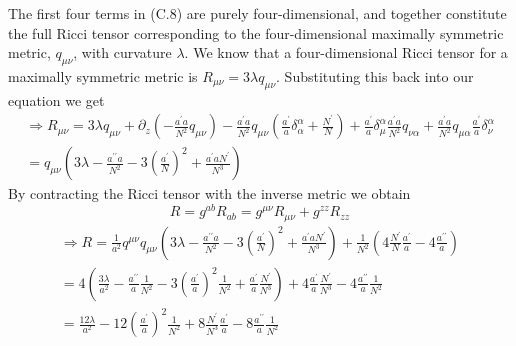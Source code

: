 \documentclass[11pt]{report}
\numberwithin{equation}{chapter}
\begin{document}
The first four terms in (C.8) are purely four-dimensional, and together constitute the full Ricci tensor corresponding to the four-dimensional maximally symmetric metric, $q_{\mu\nu}$, with curvature $\lambda$. We know that a four-dimensional Ricci tensor for a maximally symmetric metric is $R_{\mu\nu} = 3\lambda q_{\mu\nu}$. Substituting this back into our equation we get
\begin{equation}
    \begin{aligned}
        \Rightarrow R_{\mu\nu} = 3\lambda q_{\mu\nu} + \partial_{z}(-\frac{a^\prime a}{N^2}q_{\mu\nu}) - \frac{a^\prime a}{N^2}q_{\mu\nu}(\frac{a^\prime}{a}\delta_{\alpha}^{\alpha} + \frac{N^\prime}{N}) + \frac{a^\prime}{a}\delta_{\mu}^{\alpha}\frac{a^\prime a}{N^2}q_{\nu\alpha} + \frac{a^\prime a}{N^2}q_{\mu\alpha}\frac{a^\prime}{a}\delta_{\nu}^{\alpha}
        \\
        = q_{\mu\nu}(3\lambda - \frac{a^{\prime\prime}a}{N^2} - 3(\frac{a^\prime}{N})^2 + \frac{a^\prime aN^\prime}{N^3})
\end{aligned}
\end{equation}
By contracting the Ricci tensor with the inverse metric we obtain
\begin{equation}
    R = g^{ab}R_{ab} = g^{\mu\nu}R_{\mu\nu} + g^{zz}R_{zz}
\end{equation}
\begin{equation}
\begin{aligned}
      \Rightarrow R = \frac{1}{a^2}q^{\mu\nu}q_{\mu\nu}(3\lambda - \frac{a^{\prime\prime}a}{N^2} - 3(\frac{a^\prime}{N})^2 + \frac{a^\prime aN^\prime}{N^3}) + \frac{1}{N^2}(4\frac{N^\prime}{N}\frac{a^\prime}{a} - 4\frac{a^{\prime\prime}}{a}) \\
      = 4(\frac{3\lambda}{a^2} - \frac{a^{\prime\prime}}{a}\frac{1}{N^2} - 3(\frac{a^\prime}{a})^2\frac{1}{N^2} + \frac{a^\prime}{a}\frac{N^\prime}{N^3}) + 4\frac{a^\prime}{a}\frac{N^\prime}{N^3} - 4\frac{a^{\prime\prime}}{a}\frac{1}{N^2} \\
      = \frac{12\lambda}{a^2} - 12(\frac{a^\prime}{a})^2\frac{1}{N^2}+8\frac{N^\prime}{N^3}\frac{a^\prime}{a}-8\frac{a^{\prime\prime}}{a}\frac{1}{N^2}
\end{aligned}
\end{equation}

\printbibliography
\end{document}
